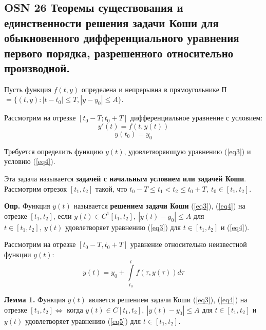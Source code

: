 \subsection{OSN 26 Теоремы существования и единственности решения задачи Коши для обыкновенного дифференциального уравнения первого порядка, разрешенного относительно производной.}

Пусть функция $f(t,y)$ определена и непрерывна в прямоугольнике 
П$ = \{(t, y) : |t - t_0| \leqslant T, |y - y_0| \leqslant A\}$.

Рассмотрим на отрезке $[t_0 - T ; t_0 + T ]$ дифференциальное уравнение с условием:
\begin{equation}
    y'(t) = f(t, y(t))
    \label{eq3}
\end{equation}
\begin{equation}
    y(t_0) = y_0
    \label{eq4}
\end{equation}

Требуется определить функцию $y(t)$, удовлетворяющую уравнению (\ref{eq3}) и условию (\ref{eq4}).

Эта задача называется \textbf{задачей с начальным условием или задачей Коши}. Рассмотрим отрезок $[t_1, t_2]$ такой, что $t_0 - T \leqslant t_1 < t_2 \leqslant t_0 + T,~t_0 \in [t_1, t_2]$.

\textbf{Опр.} Функция $y(t)$ называется \textbf{решением задачи Коши} (\ref{eq3}), (\ref{eq4}) на отрезке $[t_1, t_2]$, если $y(t) \in C^1[t_1, t_2],~|y(t) - y_0| \leqslant A$ для $t \in [t_1, t_2],~y(t)$ удовлетворяет уравнению (\ref{eq3}) для $t \in [t_1, t_2]$ и (\ref{eq4}).

Рассмотрим на отрезке $[t_0 - T,t_0 + T]$ уравнение относительно неизвестной функции $y(t)$:
\begin{equation}
    y(t) = y_0 + \int\limits_{t_0}^{t}f(\tau, y(\tau))d\tau
    \label{eq5}
\end{equation}

\textbf{Лемма 1.} Функция $y(t)$ является решением задачи Коши (\ref{eq3}), (\ref{eq4}) на отрезке $[t_1, t_2] \iff$ когда $y(t) \in C[t_1, t_2],~|y(t) - y_0| \leqslant A$ для $t \in [t_1, t_2]$ и $y(t)$ удовлетворяет уравнению (\ref{eq5}) для $t \in [t_1, t_2]$.

